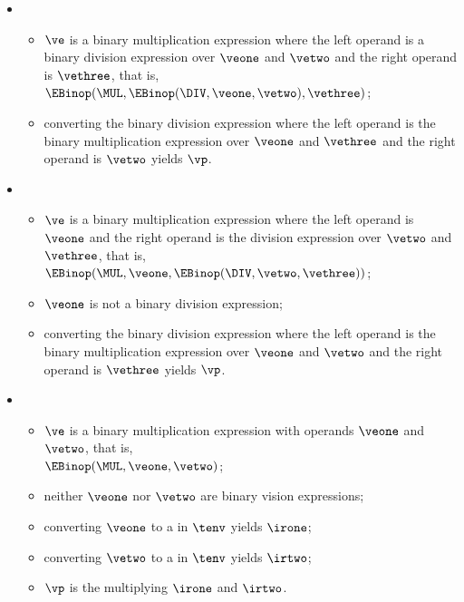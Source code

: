 \begin{itemize}
  \item {}
  \begin{itemize}
    \item $\ve$ is a binary multiplication expression where the left operand is a binary division expression over $\veone$ and $\vetwo$
          and the right operand is $\vethree$, that is, \\ $\EBinop(\MUL, \EBinop(\DIV, \veone, \vetwo), \vethree)$;
    \item converting the binary division expression where the left operand is the binary multiplication expression  over $\veone$
          and $\vethree$ and the right operand is $\vetwo$ yields $\vp$\ProseOrTypeErrorOrCannotBeTransformed.
  \end{itemize}

  \item {}
  \begin{itemize}
    \item $\ve$ is a binary multiplication expression where the left operand is $\veone$ and the right operand
          is the division expression over $\vetwo$ and $\vethree$, that is, \\
          $\EBinop(\MUL, \veone, \EBinop(\DIV, \vetwo, \vethree))$;
    \item $\veone$ is not a binary division expression;
    \item converting the binary division expression where the left operand is the binary multiplication expression  over $\veone$
          and $\vetwo$ and the right operand is $\vethree$ yields $\vp$\ProseOrTypeErrorOrCannotBeTransformed.
  \end{itemize}

  \item {}
  \begin{itemize}
    \item $\ve$ is a binary multiplication expression with operands $\veone$ and $\vetwo$, that is, \\ $\EBinop(\MUL, \veone, \vetwo)$;
    \item neither $\veone$ nor $\vetwo$ are binary vision expressions;
    \item converting $\veone$ to a \symbolicexpressionterm{} in $\tenv$ yields $\irone$\ProseOrTypeErrorOrCannotBeTransformed;
    \item converting $\vetwo$ to a \symbolicexpressionterm{} in $\tenv$ yields $\irtwo$\ProseOrTypeErrorOrCannotBeTransformed;
    \item $\vp$ is the \symbolicexpressionterm{} multiplying $\irone$ and $\irtwo$.
  \end{itemize}


\end{itemize}

